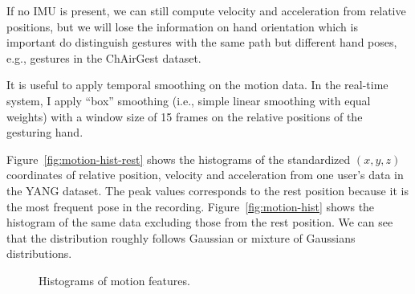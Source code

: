 If no IMU is present, we can still compute velocity and acceleration from
relative positions, but we will lose the information on hand orientation which
is important do distinguish gestures with the same path but different hand
poses, e.g., gestures in the ChAirGest dataset.

It is useful to apply temporal smoothing on the motion data. In the
real-time system, I apply ``box'' smoothing (i.e., simple linear smoothing
with equal weights) with a window size of 15 frames on the relative positions of
the gesturing hand.

Figure~\ref{fig:motion-hist-rest} shows the histograms of the standardized $(x,
y, z)$ coordinates of relative position, velocity and acceleration from one user's
data in the YANG dataset. The peak values corresponds to the rest position
because it is the most frequent pose in the recording.
Figure~\ref{fig:motion-hist} shows the histogram of the same data excluding
those from the rest position. We can see that the distribution roughly follows
Gaussian or mixture of Gaussians distributions.

\begin{figure}[!tbh]
\centering
{}
\caption{Histograms of motion features.}
\end{figure}

